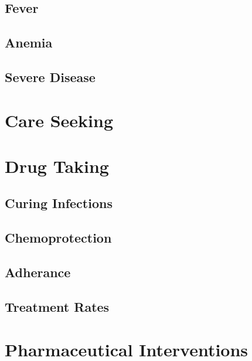 \documentclass[
]{book}
\begin{document}
\hypertarget{fever}{%
\section{Fever}\label{fever}}

\hypertarget{anemia}{%
\section{Anemia}\label{anemia}}

\hypertarget{severe-disease}{%
\section{Severe Disease}\label{severe-disease}}

\hypertarget{care-seeking}{%
\chapter{Care Seeking}\label{care-seeking}}

\hypertarget{drug-taking-1}{%
\chapter{Drug Taking}\label{drug-taking-1}}

\hypertarget{curing-infections}{%
\section{Curing Infections}\label{curing-infections}}

\hypertarget{chemoprotection}{%
\section{Chemoprotection}\label{chemoprotection}}

\hypertarget{adherance}{%
\section{Adherance}\label{adherance}}

\hypertarget{treatment-rates}{%
\section{Treatment Rates}\label{treatment-rates}}

\hypertarget{pharmaceutical-interventions}{%
\chapter{Pharmaceutical Interventions}\label{pharmaceutical-interventions}}
\end{document}
